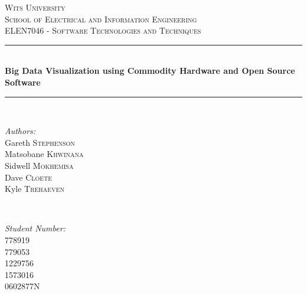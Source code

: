 \documentclass[12pt]{article} %
\begin{document}
	
	
	\begin{titlepage}
		
		\newcommand{\HRule}{\rule{\linewidth}{0.5mm}} %
		
		\center %
		
		\textsc{\LARGE Wits University}\\[1.5cm] %
		\textsc{\Large School of Electrical and Information Engineering}\\[0.5cm] %
		\textsc{\large ELEN7046 - Software Technologies and Techniques}\\[0.5cm] %
		
		\HRule \\[0.4cm]
		{ \huge \bfseries Big Data Visualization using Commodity Hardware and Open Source Software}\\[0.4cm] %
		
		\HRule \\[0.6cm]
		
		\begin{minipage}
			{0.4
				\textwidth} 
			\begin{flushleft}
				\large \emph{Authors:}\\
				Gareth \textsc{Stephenson} \\
				Matsobane \textsc{Khwinana} \\
				Sidwell \textsc{Mokhemisa} \\
				Dave \textsc{Cloete}\\
				Kyle \textsc{Trehaeven}
			\end{flushleft}
		\end{minipage}
		~ 
		\begin{minipage}
			{0.4
				\textwidth} 
			\begin{flushright}
				\large \emph{Student Number:} \\
				778919 \\
				779053  \\
				1229756 \\
				1573016 \\
				0602877N
			\end{flushright}
		\end{minipage}
		\\[1cm]
		

\end{titlepage}
\end{document}
